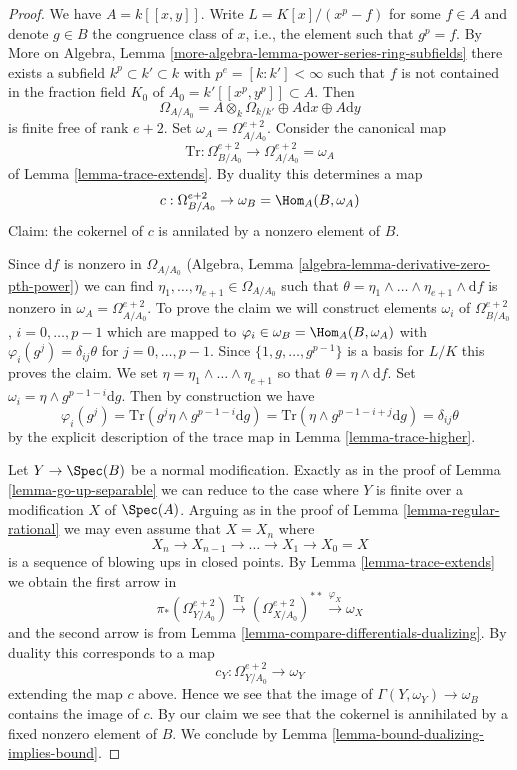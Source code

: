 \begin{proof}
We have $A = k[[x, y]]$. Write $L = K[x]/(x^p - f)$ for some $f \in A$
and denote $g \in B$ the congruence class of $x$, i.e., the element such
that $g^p = f$. By
More on Algebra, Lemma \ref{more-algebra-lemma-power-series-ring-subfields}
there exists a subfield $k^p \subset k' \subset k$ with
$p^e = [k : k'] < \infty$
such that $f$ is not contained in the fraction field $K_0$ of
$A_0 = k'[[x^p, y^p]] \subset A$. Then
$$
\Omega_{A/A_0} =
A \otimes_k \Omega_{k/k'} \oplus A \text{d}x \oplus A \text{d}y
$$
is finite free of rank $e + 2$. Set $\omega_A = \Omega^{e + 2}_{A/A_0}$.
Consider the canonical map
$$
\text{Tr} :
\Omega^{e + 2}_{B/A_0}
\longrightarrow
\Omega^{e + 2}_{A/A_0} = \omega_A
$$
of Lemma \ref{lemma-trace-extends}. By duality this determines a map
$$
c : \Omega^{e + 2}_{B/A_0} \to \omega_B = \Hom_A(B, \omega_A)
$$
Claim: the cokernel of $c$ is annilated by a nonzero element of $B$.

\medskip\noindent
Since $\text{d}f$ is nonzero in $\Omega_{A/A_0}$
(Algebra, Lemma \ref{algebra-lemma-derivative-zero-pth-power}) we can find
$\eta_1, \ldots, \eta_{e + 1} \in \Omega_{A/A_0}$ such that
$\theta = \eta_1 \wedge \ldots \wedge \eta_{e + 1} \wedge \text{d}f$ is
nonzero in $\omega_A = \Omega^{e + 2}_{A/A_0}$. To prove the claim we
will construct elements $\omega_i$ of $\Omega^{e + 2}_{B/A_0}$,
$i = 0, \ldots, p - 1$ which are mapped to
$\varphi_i \in \omega_B = \Hom_A(B, \omega_A)$
with $\varphi_i(g^j) = \delta_{ij}\theta$ for $j = 0, \ldots, p - 1$.
Since $\{1, g, \ldots, g^{p - 1}\}$ is a basis for $L/K$ this
proves the claim. We set
$\eta = \eta_1 \wedge \ldots \wedge \eta_{e + 1}$
so that $\theta = \eta \wedge \text{d}f$.
Set $\omega_i = \eta \wedge g^{p - 1 - i}\text{d}g$. Then
by construction we have
$$
\varphi_i(g^j) = \text{Tr}(g^j \eta \wedge g^{p - 1 - i}\text{d}g) =
\text{Tr}(\eta \wedge g^{p - 1 - i + j}\text{d}g) = \delta_{ij} \theta
$$
by the explicit description of the trace map in Lemma \ref{lemma-trace-higher}.

\medskip\noindent
Let $Y \to \Spec(B)$ be a normal modification. Exactly as in the proof of
Lemma \ref{lemma-go-up-separable} we can reduce to the case where $Y$
is finite over a modification $X$ of $\Spec(A)$. Arguing as in the proof
of Lemma \ref{lemma-regular-rational} we may even assume that $X = X_n$ where
$$
X_n \to X_{n - 1} \to \ldots \to X_1 \to X_0 = X
$$
is a sequence of blowing ups in closed points. By
Lemma \ref{lemma-trace-extends} we obtain the first arrow in
$$
\pi_*(\Omega^{e + 2}_{Y/A_0})
\xrightarrow{\text{Tr}}
(\Omega^{e + 2}_{X/A_0})^{**}
\xrightarrow{\varphi_X}
\omega_X
$$
and the second arrow is from
Lemma \ref{lemma-compare-differentials-dualizing}.
By duality this corresponds to a map
$$
c_Y : \Omega^{e + 2}_{Y/A_0} \longrightarrow \omega_Y
$$
extending the map $c$ above. Hence we see that the image of
$\Gamma(Y, \omega_Y) \to \omega_B$ contains the image of $c$.
By our claim we see that the cokernel is annihilated by
a fixed nonzero element of $B$. We conclude by
Lemma \ref{lemma-bound-dualizing-implies-bound}.
\end{proof}






